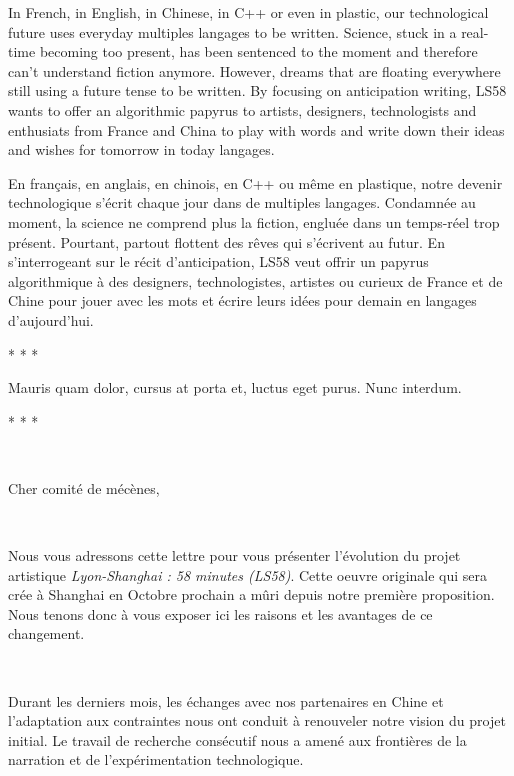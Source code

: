 In French, in English, in Chinese, in C++ or even in plastic, our
technological future uses everyday multiples langages to be written.
Science, stuck in a real-time becoming too present, has been sentenced
to the moment and therefore can{\textquoteright}t understand fiction
anymore. However, dreams that are floating everywhere still using a
future tense to be written. By focusing on anticipation writing, LS58
wants to offer an algorithmic papyrus to artists, designers,
technologists and enthusiats from France and China to play with words
and write down their ideas and wishes for tomorrow in today langages.

En fran\c{c}ais, en anglais, en chinois, en C++ ou m\^eme en plastique,
notre devenir technologique s{\textquoteright}\'ecrit chaque jour dans
de multiples langages. Condamn\'ee au moment, la science ne comprend
plus la fiction, englu\'ee dans un temps-r\'eel trop pr\'esent.
Pourtant, partout flottent des r\^eves qui s{\textquoteright}\'ecrivent
au futur. En s{\textquoteright}interrogeant sur le r\'ecit
d{\textquoteright}anticipation, LS58 veut offrir un papyrus
algorithmique \`a des designers, technologistes, artistes ou curieux de
France et de Chine pour jouer avec les mots et \'ecrire leurs id\'ees
pour demain en langages d{\textquoteright}aujourd{\textquoteright}hui. 

{\centering
* * *
\par}

{\centering
Mauris quam dolor, cursus at porta et, luctus eget purus. Nunc interdum.
\par}

{\centering
* * *
\par}

~

{\centering
Cher comit\'e de m\'ec\`enes,
\par}

~

Nous vous adressons cette lettre pour vous pr\'esenter
l{\textquoteright}\'evolution du projet artistique
\textit{Lyon-Shanghai : 58 minutes (LS58)}. Cette oeuvre
originale qui sera cr\'ee \`a Shanghai en Octobre prochain a m\^uri
depuis notre premi\`ere proposition. Nous tenons donc \`a vous exposer
ici les raisons et les avantages de ce changement.

~

Durant les derniers mois, les \'echanges avec nos partenaires en Chine
et l{\textquoteright}adaptation aux contraintes nous ont conduit \`a
renouveler notre vision du projet initial. Le travail de recherche
cons\'ecutif nous a amen\'e aux fronti\`eres de la narration et de
l{\textquoteright}exp\'erimentation technologique.

